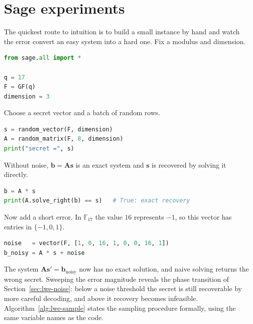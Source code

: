 \section{Sage experiments}

The quickest route to intuition is to build a small instance by hand and watch the error convert an easy system into a hard one. Fix a modulus and dimension.

\begin{lstlisting}[language=Python]
from sage.all import *

q = 17
F = GF(q)
dimension = 3
\end{lstlisting}

Choose a secret vector and a batch of random rows.

\begin{lstlisting}[language=Python]
s = random_vector(F, dimension)
A = random_matrix(F, 8, dimension)
print("secret =", s)
\end{lstlisting}

Without noise, $\mathbf{b}=\mathbf{A}\mathbf{s}$ is an exact system and $\mathbf{s}$ is recovered by solving it directly.

\begin{lstlisting}[language=Python]
b = A * s
print(A.solve_right(b) == s)   # True: exact recovery
\end{lstlisting}

Now add a short error. In $\mathbb{F}_{17}$ the value $16$ represents $-1$, so this vector has entries in $\{-1,0,1\}$.

\begin{lstlisting}[language=Python]
noise   = vector(F, [1, 0, 16, 1, 0, 0, 16, 1])
b_noisy = A * s + noise
\end{lstlisting}

The system $\mathbf{A}\mathbf{s}'=\mathbf{b}_{\text{noisy}}$ now has no exact solution, and naive solving returns the wrong secret. Sweeping the error magnitude reveals the phase transition of Section~\ref{sec:lwe-noise}: below a noise threshold the secret is still recoverable by more careful decoding, and above it recovery becomes infeasible. Algorithm~\ref{alg:lwe-sample} states the sampling procedure formally, using the same variable names as the code.

